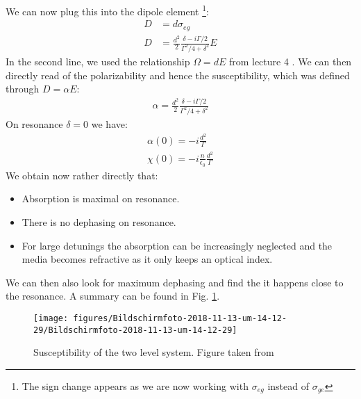 \documentclass[10pt]{article}
\let\cite\citep
\providecommand\citep{\cite}
\begin{document}
We can now plug this into the dipole element \footnote{The sign change appears as we are now working with $\sigma_{eg}$ instead of $\sigma_{ge}$ }:
\begin{align}
D &= d \sigma_{eg}\\
D &= \frac{d^2}{2}\frac{\delta-i\Gamma/2}{\Gamma^2/4+\delta^2}E
\end{align}
In the second line, we used the relationship $\Omega = dE$ from lecture 4 \cite{Jendrzejewskia}. We can then directly read of the polarizability and hence the susceptibility, which was defined through $D = \alpha E$:
\begin{align}
\alpha =\frac{d^2}{2}\frac{\delta-i\Gamma/2}{\Gamma^2/4+\delta^2}
\end{align}
On resonance $\delta=0$ we have:
\begin{align}
\alpha(0) =-i\frac{d^2}{\Gamma}\\
\chi(0) = -i\frac{n}{\epsilon_0}\frac{d^2}{\Gamma}
\end{align}
We obtain now rather directly that:
\begin{itemize}
\item Absorption is maximal on resonance. 
\item There is no dephasing on resonance. 
\item For large detunings the absorption can be increasingly neglected and the media becomes refractive as it only keeps an optical index.
\end{itemize}
We can then also look for maximum dephasing and find the it happens close to the resonance. A summary can be found in Fig. \ref{715970}.
\begin{figure}[h!]
\begin{center}
\texttt{[image: figures/Bildschirmfoto-2018-11-13-um-14-12-29/Bildschirmfoto-2018-11-13-um-14-12-29]}
\caption{{Susceptibility of the two level system. Figure taken from
\protect\cite{grynberg}
{\label{715970}}%
}}
\end{center}
\end{figure}
\end{document}
